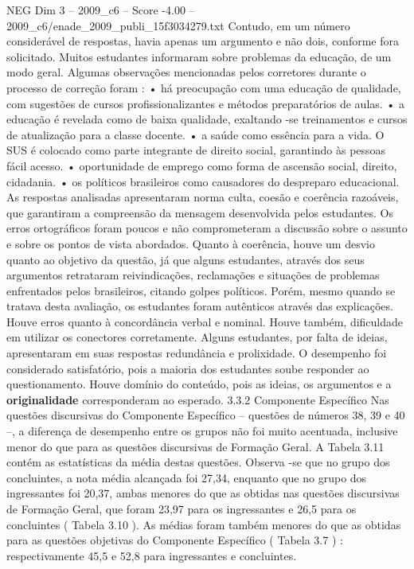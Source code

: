\begin{textsample}{NEG Dim 3 – 2009\_c6 – Score -4.00 – 2009\_c6/enade\_2009\_publi\_15f3034279.txt}
Contudo, em um número considerável de respostas, havia apenas um argumento e não dois, conforme fora solicitado.
Muitos estudantes informaram sobre problemas da educação, de um modo geral.
Algumas observações mencionadas pelos corretores durante o processo de correção foram : • há preocupação com uma educação de qualidade, com sugestões de cursos profissionalizantes e métodos preparatórios de aulas. • a educação é revelada como de baixa qualidade, exaltando -se treinamentos e cursos de atualização para a classe docente. • a saúde como essência para a vida.
O SUS é colocado como parte integrante de direito social, garantindo às pessoas fácil acesso. • oportunidade de emprego como forma de ascensão social, direito, cidadania. • os políticos brasileiros como causadores do despreparo educacional.
As respostas analisadas apresentaram norma culta, coesão e coerência razoáveis, que garantiram a compreensão da mensagem desenvolvida pelos estudantes.
Os erros ortográficos foram poucos e não comprometeram a discussão sobre o assunto e sobre os pontos de vista abordados.
Quanto à coerência, houve um desvio quanto ao objetivo da questão, já que alguns estudantes, através dos seus argumentos retrataram reivindicações, reclamações e situações de problemas enfrentados pelos brasileiros, citando golpes políticos.
Porém, mesmo quando se tratava desta avaliação, os estudantes foram autênticos através das explicações.
Houve erros quanto à concordância verbal e nominal.
Houve também, dificuldade em utilizar os conectores corretamente.
Alguns estudantes, por falta de ideias, apresentaram em suas respostas redundância e prolixidade.
O desempenho foi considerado satisfatório, pois a maioria dos estudantes soube responder ao questionamento.
Houve domínio do conteúdo, pois as ideias, os argumentos e a \textbf{originalidade} corresponderam ao esperado. 3.3.2 Componente Específico Nas questões discursivas do Componente Específico – questões de números 38, 39 e 40 –, a diferença de desempenho entre os grupos não foi muito acentuada, inclusive menor do que para as questões discursivas de Formação Geral.
A Tabela 3.11 contém as estatísticas da média destas questões.
Observa -se que no grupo dos concluintes, a nota média alcançada foi 27,34, enquanto que no grupo dos ingressantes foi 20,37, ambas menores do que as obtidas nas questões discursivas de Formação Geral, que foram 23,97 para os ingressantes e 26,5 para os concluintes ( Tabela 3.10 ).
As médias foram também menores do que as obtidas para as questões objetivas do Componente Específico ( Tabela 3.7 ) : respectivamente 45,5 e 52,8 para ingressantes e concluintes.

\end{textsample}
